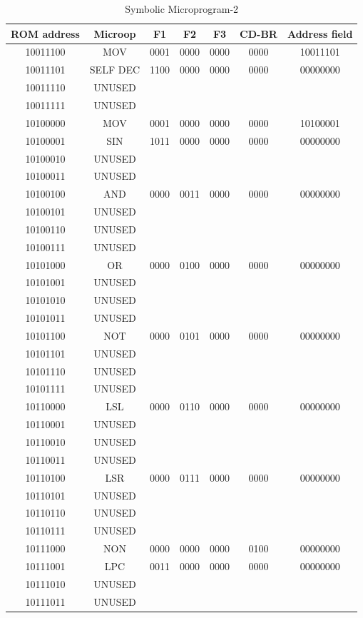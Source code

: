 \documentclass[pdftex,12pt,a4paper]{article}
\begin{document}
\begin{table}[h]
    \centering
    \begin{tabular}{|c|c|c|c|c|c|c|}
    \hline
    ROM address	&Microop&	F1&	F2&	F3&	CD-BR&		Address field \\\hline
10011100 &	MOV	    &	0001 &		0000 &		0000 &		0000	 &		10011101\\ \hline
10011101 &	SELF DEC&	1100 &		0000 &		0000 &		0000	 &		00000000		 \\\hline
10011110 &	UNUSED  &&&&&\\ \hline
10011111 &	UNUSED  &&&&&\\ \hline
10100000 &	MOV	    &		0001 &		0000 &		0000 &		0000	 &		10100001\\ \hline
10100001 &	SIN		&	  1011 &		0000 &		0000 &		0000	 &		00000000\\ \hline
10100010 &	UNUSED  &&&&&\\\hline
10100011 &	UNUSED  &&&&&\\\hline
10100100 &	AND     &	 0000 &		0011 &		0000 &		0000	 &		00000000\\ \hline
10100101 &	UNUSED  &&&&&\\\hline
10100110 &	UNUSED  &&&&&\\\hline
10100111 &	UNUSED  &&&&&\\\hline
10101000 &	OR      &		0000 &		0100 &		0000 &		0000	 &		00000000\\ \hline
10101001 &	UNUSED  &&&&&\\\hline
10101010 &	UNUSED  &&&&&\\\hline
10101011 &	UNUSED  &&&&&\\\hline
10101100 &	NOT     &		0000 &		0101 &		0000 &		0000	 &		00000000\\\hline
10101101 &	UNUSED  &&&&&\\\hline
10101110 &	UNUSED  &&&&&\\\hline
10101111 &	UNUSED  &&&&&\\\hline
10110000 &	LSL     &		0000 &		0110 &		0000 &		0000	 &		00000000\\\hline
10110001 &	UNUSED  &&&&&\\\hline
10110010 &	UNUSED  &&&&&\\\hline
10110011 &	UNUSED  &&&&&\\\hline
10110100 &	LSR     &		0000 &		0111 &		0000 &		0000	 &		00000000\\\hline
10110101 &	UNUSED  &&&&&\\\hline
10110110 &	UNUSED  &&&&&\\\hline
10110111 &	UNUSED  &&&&&\\\hline
10111000 &	NON     &		0000 &		0000 &		0000 &		0100	 &		00000000\\\hline
10111001 &	LPC     &	   0011 &		0000 &		0000 &		0000	 &		00000000\\\hline
10111010 &	UNUSED  &&&&&\\\hline
10111011 &	UNUSED  &&&&&\\\hline
   \end{tabular}
    \caption{Symbolic Microprogram-2}
    \label{mp2}
\end{table}
\end{document}
